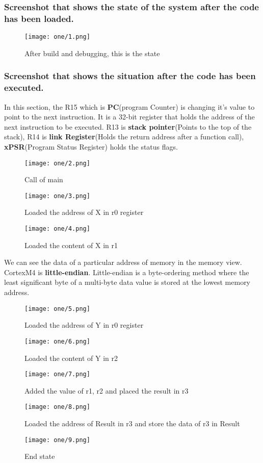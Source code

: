\documentclass[a4paper,12pt]{article}
\begin{document}
\subsubsection{Screenshot that shows the state of the system after the code has been loaded.}
\vspace{0.3cm}
\begin{figure}[H]
    \centering
    \texttt{[image: one/1.png]}
    \caption{After build and debugging, this is the state }
\end{figure}

\subsubsection{Screenshot that shows the situation after the code has been executed.}
In this section, the R15 which is \textbf{PC}(program Counter) is changing it's value to point to the next instruction. It is a 32-bit register that holds the address of the next instruction to be executed. R13 is \textbf{stack pointer}(Points to the top of the stack), R14 is \textbf{link Register}(Holds the return address after a function call), \textbf{xPSR}(Program Status Register) holds the status flags.
\begin{figure}[H]
    \centering
    \texttt{[image: one/2.png]}
    \caption{Call of main}
\end{figure}
\begin{figure}[H]
    \centering
    \texttt{[image: one/3.png]}
    \caption{Loaded the address of X in r0 register}
\end{figure}
\begin{figure}[H]
    \centering
    \texttt{[image: one/4.png]}
    \caption{Loaded the content of X in r1}
\end{figure}
We can see the data of a particular address of memory in the memory view. CortexM4 is \textbf{little-endian}. Little-endian is a byte-ordering method where the least significant byte of a multi-byte data value is stored at the lowest memory address.
\begin{figure}[H]
    \centering
    \texttt{[image: one/5.png]}
    \caption{Loaded the address of Y in r0 register}
\end{figure}
\begin{figure}[H]
    \centering
    \texttt{[image: one/6.png]}
    \caption{Loaded the content of Y in r2}
\end{figure}
\begin{figure}[H]
    \centering
    \texttt{[image: one/7.png]}
    \caption{Added the value of r1, r2 and placed the result in r3}
\end{figure}
\begin{figure}[H]
    \centering
    \texttt{[image: one/8.png]}
    \caption{Loaded the address of Result in r3 and store the data of r3 in Result}
\end{figure}
\begin{figure}[H]
    \centering
    \texttt{[image: one/9.png]}
    \caption{End state }
\end{figure}
\end{document}

